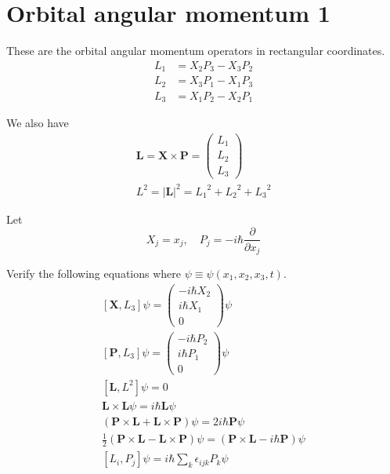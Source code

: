 

\section*{Orbital angular momentum 1}

These are the orbital angular momentum operators in rectangular coordinates.
\begin{align*}
L_1&=X_2P_3-X_3P_2
\\
L_2&=X_3P_1-X_1P_3
\\
L_3&=X_1P_2-X_2P_1
\end{align*}

We also have
\begin{gather*}
\mathbf L=\mathbf X\times\mathbf P
=\begin{pmatrix}
L_1
\\
L_2
\\
L_3
\end{pmatrix}
\\[1ex]
L^2=|\mathbf L|^2={L_1}^2+{L_2}^2+{L_3}^2
\end{gather*}

Let
\begin{equation*}
X_j=x_j,\quad P_j=-i\hbar\frac{\partial}{\partial x_j}
\end{equation*}

Verify the following equations where $\psi\equiv\psi(x_1,x_2,x_3,t)$.
\begin{gather*}
%
[\mathbf X,L_3]\psi
=\begin{pmatrix}
-i\hbar X_2
\\
i\hbar X_1
\\
0
\end{pmatrix}\psi
\tag{1}
\\[1ex]
%
[\mathbf P,L_3]\psi
=\begin{pmatrix}
-i\hbar P_2
\\
i\hbar P_1
\\
0
\end{pmatrix}\psi
\tag{2}
\\[1ex]
%
[\mathbf L,L^2]\psi=0
\tag{3}
\\[1ex]
%
\mathbf L\times\mathbf L\psi=i\hbar\mathbf L\psi
\tag{4}
\\[1ex]
%
(\mathbf P\times\mathbf L+\mathbf L\times\mathbf P)\psi=2i\hbar\mathbf P\psi
\tag{5}
\\[1ex]
%
\tfrac{1}{2}(\mathbf P\times\mathbf L-\mathbf L\times\mathbf P)\psi
=(\mathbf P\times\mathbf L-i\hbar\mathbf P)\psi
\tag{6}
\\[1ex]
%
[L_i,P_j]\psi=i\hbar\sum_k\epsilon_{ijk}P_k\psi
\tag{7}
\end{gather*}


